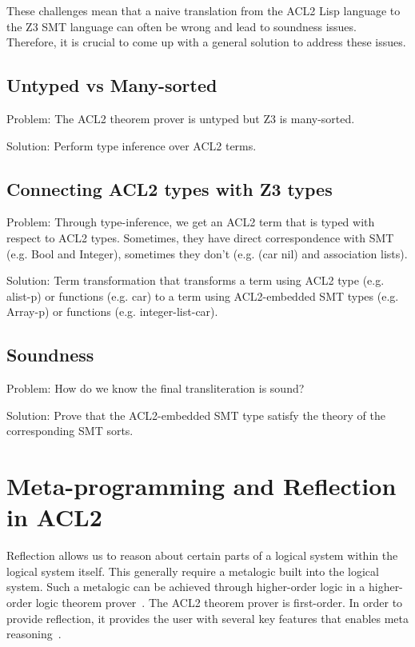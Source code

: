 These challenges mean that a naive translation from the ACL2 Lisp language to
the Z3 SMT language can often be wrong and lead to soundness issues. Therefore,
it is crucial to come up with a general solution to address these issues.
\subsection{Untyped vs Many-sorted}
Problem: The ACL2 theorem prover is untyped but Z3 is many-sorted.

Solution: Perform type inference over ACL2 terms.

\subsection{Connecting ACL2 types with Z3 types}
Problem: Through type-inference, we get an ACL2 term that is typed with respect
to ACL2 types. Sometimes, they have direct correspondence with SMT (e.g. Bool
and Integer), sometimes they don't (e.g. (car nil) and association lists).

Solution: Term transformation that transforms a term using ACL2 type (e.g.
alist-p) or functions (e.g. car) to a term using ACL2-embedded SMT types (e.g.
Array-p) or functions (e.g. integer-list-car).

\subsection{Soundness}
Problem: How do we know the final transliteration is sound?

Solution: Prove that the ACL2-embedded SMT type satisfy the theory of the
corresponding SMT sorts. 

\section{Meta-programming and Reflection in ACL2}
\label{sec:meta}

Reflection allows us to reason about certain parts of a logical system within
the logical system itself. This generally require a metalogic built into the
logical system. Such a metalogic can be achieved through higher-order logic in a
higher-order logic theorem prover~\cite{harrison1995}.
The ACL2 theorem prover is first-order. In order to provide reflection, it
provides the user with several key features that enables
meta reasoning~\cite{boyer1979, hunt2005, kaufmann2017}.

